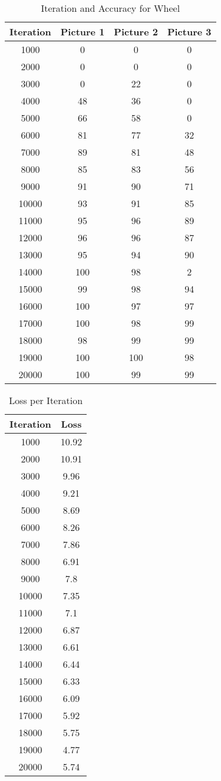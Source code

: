 \begin{table}[h!]
\centering
\begin{tabular}{|c|c|c|c|}
\hline
\textbf{Iteration} & \textbf{Picture 1} & \textbf{Picture 2} & \textbf{Picture 3} \\
\hline
1000 & 0 & 0 & 0 \\
2000 & 0 & 0 & 0 \\
3000 & 0 & 22 & 0 \\
4000 & 48 & 36 & 0 \\
5000 & 66 & 58 & 0 \\
6000 & 81 & 77 & 32 \\
7000 & 89 & 81 & 48 \\
8000 & 85 & 83 & 56 \\
9000 & 91 & 90 & 71 \\
10000 & 93 & 91 & 85 \\
11000 & 95 & 96 & 89 \\
12000 & 96 & 96 & 87 \\
13000 & 95 & 94 & 90 \\
14000 & 100 & 98 & 2 \\
15000 & 99 & 98 & 94 \\
16000 & 100 & 97 & 97 \\
17000 & 100 & 98 & 99 \\
18000 & 98 & 99 & 99 \\
19000 & 100 & 100 & 98 \\
20000 & 100 & 99 & 99 \\
\hline
\end{tabular}
\caption{Iteration and Accuracy for Wheel}
\end{table}


\begin{table}[h!]
\centering
\begin{tabular}{|c|c|}
\hline
\textbf{Iteration} & \textbf{Loss} \\
\hline
1000 & 10.92 \\
2000 & 10.91 \\
3000 & 9.96 \\
4000 & 9.21 \\
5000 & 8.69 \\
6000 & 8.26 \\
7000 & 7.86 \\
8000 & 6.91 \\
9000 & 7.8 \\
10000 & 7.35 \\
11000 & 7.1 \\
12000 & 6.87 \\
13000 & 6.61 \\
14000 & 6.44 \\
15000 & 6.33 \\
16000 & 6.09 \\
17000 & 5.92 \\
18000 & 5.75 \\
19000 & 4.77 \\
20000 & 5.74 \\
\hline
\end{tabular}
\caption{Loss per Iteration}
\end{table}







